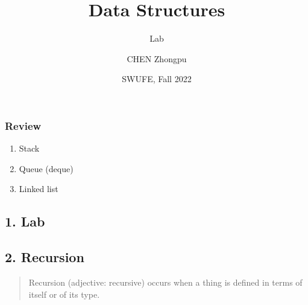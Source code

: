 \documentclass[aspectratio=169, 14pt]{beamer}
\title[Data Structures] %
{Data Structures}
\subtitle{Lab}
\author[CHEN Zhongpu] %
{CHEN Zhongpu}
\institute[] %
{
  School of Computing and Artificial Intelligence \\
  \href{mailto:zpchen@swufe.edu.cn}{zpchen@swufe.edu.cn}
}
\date[] %
{SWUFE, Fall 2022}
\begin{document}
\frame{\titlepage}

\begin{frame}
    \frametitle{Review}
    \begin{enumerate}
        \item Stack
        \item Queue (deque)
        \item Linked list
    \end{enumerate}
\end{frame}

{
    \begin{frame}
        \section{\textcolor{darkmidnightblue}{1. Lab}}
    \end{frame}

}


\begin{frame}

    \section{\textcolor{darkmidnightblue}{2. Recursion}} 

    \begin{quote}
        Recursion (adjective: recursive) occurs when a thing is defined in terms of itself or of its type.
    \end{quote}

\end{frame}
\end{document}
